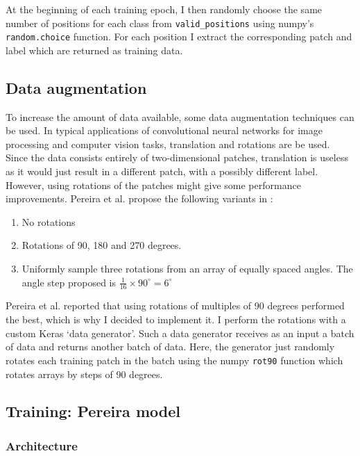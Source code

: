 \documentclass[12pt,a4paper,twoside,openright]{report}
\begin{document}
At the beginning of each training epoch, I then randomly choose the same number of positions for each class from \texttt{valid\_positions} using numpy's \texttt{random.choice} function. For each position I extract the corresponding patch and label which are returned as training data.

\subsection{Data augmentation}
To increase the amount of data available, some data augmentation techniques can be used. In typical applications of convolutional neural networks for image processing and computer vision tasks, translation and rotations are be used. Since the data consists entirely of two-dimensional patches, translation is useless as it would just result in a different patch, with a possibly different label. However, using rotations of the patches might give some performance improvements. Pereira et al. propose the following variants in \cite{pereira}:
\begin{enumerate}
	\item No rotations
	\item Rotations of 90, 180 and 270 degrees.
	\item Uniformly sample three rotations from an array of equally spaced angles. The angle step proposed is $\frac{1}{16} \times 90^{\circ} = 6^{\circ}$
\end{enumerate}
Pereira et al. reported that using rotations of multiples of 90 degrees performed the best, which is why I decided to implement it. I perform the rotations with a custom Keras `data generator'. Such a data generator receives as an input a batch of data and returns another batch of data. Here, the generator just randomly rotates each training patch in the batch using the numpy \texttt{rot90} function which rotates arrays by steps of 90 degrees.

\subsection{Training: Pereira model}

\subsubsection{Architecture}
\end{document}
